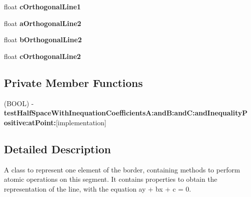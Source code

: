 \begin{DoxyCompactItemize}
\item 
\hypertarget{interface_a_t_c_zone_border_segment_a6fa3ff47dab721d2fbbaa6233f6d9ad3}{
float {\bfseries c\-Orthogonal\-Line1}}
\label{interface_a_t_c_zone_border_segment_a6fa3ff47dab721d2fbbaa6233f6d9ad3}

\item 
\hypertarget{interface_a_t_c_zone_border_segment_a3db7d9cd0716db3275d37dd1f372e83b}{
float {\bfseries a\-Orthogonal\-Line2}}
\label{interface_a_t_c_zone_border_segment_a3db7d9cd0716db3275d37dd1f372e83b}

\item 
\hypertarget{interface_a_t_c_zone_border_segment_a4d80ad3fc018d4d339b9da375ecf1648}{
float {\bfseries b\-Orthogonal\-Line2}}
\label{interface_a_t_c_zone_border_segment_a4d80ad3fc018d4d339b9da375ecf1648}

\item 
\hypertarget{interface_a_t_c_zone_border_segment_aa78c74f282e4fc0dec84c087c63ae6bd}{
float {\bfseries c\-Orthogonal\-Line2}}
\label{interface_a_t_c_zone_border_segment_aa78c74f282e4fc0dec84c087c63ae6bd}

\end{DoxyCompactItemize}
\subsection*{\-Private \-Member \-Functions}
\begin{DoxyCompactItemize}
\item 
\hypertarget{interface_a_t_c_zone_border_segment_a15c4e3bc8d07b810412721a12d5ae885}{
(\-B\-O\-O\-L) -\/ {\bfseries test\-Half\-Space\-With\-Inequation\-Coefficients\-A\-:and\-B\-:and\-C\-:and\-Inequality\-Positive\-:at\-Point\-:}{\ttfamily  \mbox{[}implementation\mbox{]}}}
\label{interface_a_t_c_zone_border_segment_a15c4e3bc8d07b810412721a12d5ae885}

\end{DoxyCompactItemize}


\subsection{\-Detailed \-Description}
\-A class to represent one element of the border, containing methods to perform atomic operations on this segment. \-It contains properties to obtain the representation of the line, with the equation ay + bx + c = 0. 

